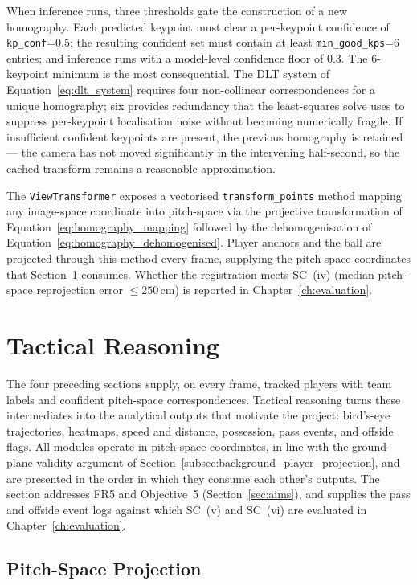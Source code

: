 When inference runs, three thresholds gate the construction of a new
homography. Each predicted keypoint must clear a per-keypoint confidence of
\texttt{kp\_conf}=0.5; the resulting confident set must contain at least
\texttt{min\_good\_kps}=6 entries; and inference runs with a model-level
confidence floor of 0.3. The 6-keypoint minimum is the most consequential.
The DLT system of Equation~\ref{eq:dlt_system} requires four non-collinear
correspondences for a unique homography; six provides redundancy that the
least-squares solve uses to suppress per-keypoint localisation noise
without becoming numerically fragile. If insufficient confident keypoints
are present, the previous homography is retained --- the camera has not
moved significantly in the intervening half-second, so the cached transform
remains a reasonable approximation.

The \texttt{ViewTransformer} exposes a vectorised \texttt{transform\_points}
method mapping any image-space coordinate into pitch-space via the
projective transformation of Equation~\ref{eq:homography_mapping} followed
by the dehomogenisation of Equation~\ref{eq:homography_dehomogenised}.
Player anchors and the ball are projected through this method every frame,
supplying the pitch-space coordinates that
Section~\ref{sec:methodology_tactical} consumes. Whether the registration
meets SC~(iv) (median pitch-space reprojection error $\leq 250$\,cm) is
reported in Chapter~\ref{ch:evaluation}.

\section{Tactical Reasoning}
\label{sec:methodology_tactical}

The four preceding sections supply, on every frame, tracked players with
team labels and confident pitch-space correspondences. Tactical reasoning
turns these intermediates into the analytical outputs that motivate the
project: bird's-eye trajectories, heatmaps, speed and distance, possession,
pass events, and offside flags. All modules operate in pitch-space
coordinates, in line with the ground-plane validity argument of
Section~\ref{subsec:background_player_projection}, and are presented in
the order in which they consume each other's outputs. The section addresses
FR5 and Objective~5 (Section~\ref{sec:aims}), and supplies the pass and
offside event logs against which SC~(v) and SC~(vi) are evaluated in
Chapter~\ref{ch:evaluation}.

\subsection{Pitch-Space Projection}
\label{subsec:methodology_projection}

